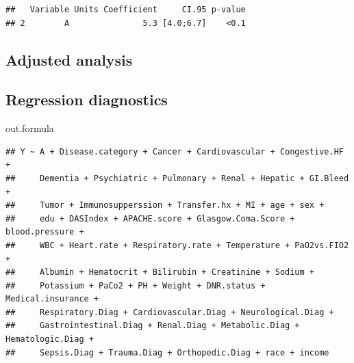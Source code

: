 \documentclass[
]{book}
\newenvironment{Shaded}{\begin{snugshade}}{\end{snugshade}}
\newcommand{\AttributeTok}[1]{\textcolor[rgb]{0.77,0.63,0.00}{#1}}
\newcommand{\CommentTok}[1]{\textcolor[rgb]{0.56,0.35,0.01}{\textit{#1}}}
\newcommand{\DecValTok}[1]{\textcolor[rgb]{0.00,0.00,0.81}{#1}}
\newcommand{\FunctionTok}[1]{\textcolor[rgb]{0.00,0.00,0.00}{#1}}
\newcommand{\NormalTok}[1]{#1}
\newcommand{\OtherTok}[1]{\textcolor[rgb]{0.56,0.35,0.01}{#1}}
\newcommand{\SpecialCharTok}[1]{\textcolor[rgb]{0.00,0.00,0.00}{#1}}
\newcommand{\StringTok}[1]{\textcolor[rgb]{0.31,0.60,0.02}{#1}}
\begin{document}
\begin{verbatim}
##   Variable Units Coefficient     CI.95 p-value
## 2        A               5.3 [4.0;6.7]    <0.1
\end{verbatim}

\hypertarget{adjusted-analysis}{%
\subsection{Adjusted analysis}\label{adjusted-analysis}}

\begin{Shaded}
\end{Shaded}

\hypertarget{regression-diagnostics}{%
\subsection{Regression diagnostics}\label{regression-diagnostics}}

\begin{Shaded}
\begin{Highlighting}[]
\NormalTok{out.formula}
\end{Highlighting}
\end{Shaded}

\begin{verbatim}
## Y ~ A + Disease.category + Cancer + Cardiovascular + Congestive.HF + 
##     Dementia + Psychiatric + Pulmonary + Renal + Hepatic + GI.Bleed + 
##     Tumor + Immunosupperssion + Transfer.hx + MI + age + sex + 
##     edu + DASIndex + APACHE.score + Glasgow.Coma.Score + blood.pressure + 
##     WBC + Heart.rate + Respiratory.rate + Temperature + PaO2vs.FIO2 + 
##     Albumin + Hematocrit + Bilirubin + Creatinine + Sodium + 
##     Potassium + PaCo2 + PH + Weight + DNR.status + Medical.insurance + 
##     Respiratory.Diag + Cardiovascular.Diag + Neurological.Diag + 
##     Gastrointestinal.Diag + Renal.Diag + Metabolic.Diag + Hematologic.Diag + 
##     Sepsis.Diag + Trauma.Diag + Orthopedic.Diag + race + income
\end{verbatim}
\end{document}
